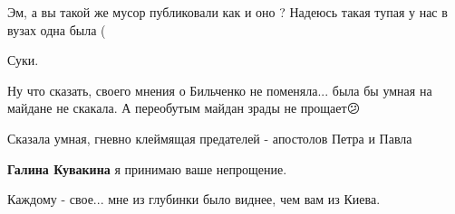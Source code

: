 \begin{itemize}
\begin{itemize}
 
Эм, а вы такой же мусор публиковали как и оно ? Надеюсь такая тупая у нас в вузах одна была (								
\end{itemize}

 
Суки.

 
Ну что сказать, своего мнения о Бильченко не поменяла... была бы умная на майдане не скакала. А переобутым майдан зрады не прощает😕

\begin{itemize}
 
Сказала умная, гневно клеймящая предателей - апостолов Петра и Павла

 
\textbf{Галина Кувакина} я принимаю ваше непрощение.

 
Каждому - свое... мне из глубинки было виднее, чем вам из Киева.

 

\end{itemize}
\end{itemize}

